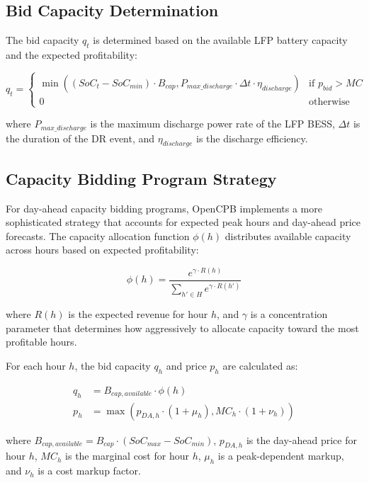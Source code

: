 \documentclass[11pt,a4paper]{article}
\begin{document}
\subsection{Bid Capacity Determination}
The bid capacity $q_t$ is determined based on the available LFP battery capacity and the expected profitability:

\begin{equation}
q_t = \begin{cases}
\min((SoC_t - SoC_{min}) \cdot B_{cap}, P_{max\_discharge} \cdot \Delta t \cdot \eta_{discharge}) & \text{if } p_{bid} > MC \\
0 & \text{otherwise}
\end{cases}
\end{equation}

where $P_{max\_discharge}$ is the maximum discharge power rate of the LFP BESS, $\Delta t$ is the duration of the DR event, and $\eta_{discharge}$ is the discharge efficiency.

\subsection{Capacity Bidding Program Strategy}
For day-ahead capacity bidding programs, OpenCPB implements a more sophisticated strategy that accounts for expected peak hours and day-ahead price forecasts. The capacity allocation function $\phi(h)$ distributes available capacity across hours based on expected profitability:

\begin{equation}
\phi(h) = \frac{e^{\gamma \cdot R(h)}}{\sum_{h' \in H} e^{\gamma \cdot R(h')}}
\end{equation}

where $R(h)$ is the expected revenue for hour $h$, and $\gamma$ is a concentration parameter that determines how aggressively to allocate capacity toward the most profitable hours.

For each hour $h$, the bid capacity $q_h$ and price $p_h$ are calculated as:

\begin{align}
q_h &= B_{cap,available} \cdot \phi(h) \\
p_h &= \max(p_{DA,h} \cdot (1 + \mu_h), MC_h \cdot (1 + \nu_h))
\end{align}

where $B_{cap,available} = B_{cap} \cdot (SoC_{max} - SoC_{min})$, $p_{DA,h}$ is the day-ahead price for hour $h$, $MC_h$ is the marginal cost for hour $h$, $\mu_h$ is a peak-dependent markup, and $\nu_h$ is a cost markup factor.
\end{document}
